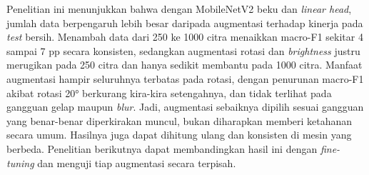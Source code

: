 \documentclass[conference]{IEEEtran}
\begin{document}
Penelitian ini menunjukkan bahwa dengan MobileNetV2 beku dan \emph{linear head}, jumlah data berpengaruh lebih besar daripada augmentasi terhadap kinerja pada \emph{test} bersih. Menambah data dari 250 ke 1000 citra menaikkan macro-F1 sekitar 4 sampai 7 pp secara konsisten, sedangkan augmentasi rotasi dan \emph{brightness} justru merugikan pada 250 citra dan hanya sedikit membantu pada 1000 citra. Manfaat augmentasi hampir seluruhnya terbatas pada rotasi, dengan penurunan macro-F1 akibat rotasi 20° berkurang kira-kira setengahnya, dan tidak terlihat pada gangguan gelap maupun \emph{blur}. Jadi, augmentasi sebaiknya dipilih sesuai gangguan yang benar-benar diperkirakan muncul, bukan diharapkan memberi ketahanan secara umum. Hasilnya juga dapat dihitung ulang dan konsisten di mesin yang berbeda. Penelitian berikutnya dapat membandingkan hasil ini dengan \emph{fine-tuning} dan menguji tiap augmentasi secara terpisah.



\end{document}
